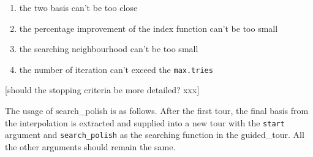 \documentclass[12pt]{article}
\providecommand{\tightlist}{%
  \setlength{\itemsep}{0pt}\setlength{\parskip}{0pt}}
\newenvironment{Shaded}{\begin{snugshade}}{\end{snugshade}}
\newcommand{\DataTypeTok}[1]{\textcolor[rgb]{0.13,0.29,0.53}{#1}}
\newcommand{\DecValTok}[1]{\textcolor[rgb]{0.00,0.00,0.81}{#1}}
\newcommand{\KeywordTok}[1]{\textcolor[rgb]{0.13,0.29,0.53}{\textbf{#1}}}
\newcommand{\NormalTok}[1]{#1}
\newcommand{\OperatorTok}[1]{\textcolor[rgb]{0.81,0.36,0.00}{\textbf{#1}}}
\newcommand{\OtherTok}[1]{\textcolor[rgb]{0.56,0.35,0.01}{#1}}
\newcommand{\StringTok}[1]{\textcolor[rgb]{0.31,0.60,0.02}{#1}}
\begin{document}
\begin{enumerate}
\def\labelenumi{\arabic{enumi})}
\tightlist
\item
  the two basis can't be too close
\item
  the percentage improvement of the index function can't be too small
\item
  the searching neighbourhood can't be too small
\item
  the number of iteration can't exceed the \texttt{max.tries}
\end{enumerate}

{[}should the stopping criteria be more detailed? xxx{]}

The usage of search\_polish is as follows. After the first tour, the
final basis from the interpolation is extracted and supplied into a new
tour with the \texttt{start} argument and \texttt{search\_polish} as the
searching function in the guided\_tour. All the other arguments should
remain the same.

\begin{Shaded}
\end{Shaded}
\end{document}
